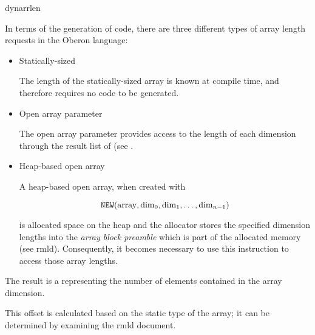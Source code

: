 \begin{instruction}{dynarrlen}

  \begin{notes}

    In terms of the generation of code, there are three different
    types of array length requests in the Oberon language:

    \begin{itemize}
    \item Statically-sized

      The length of the statically-sized array is known at compile
      time, and therefore requires no code to be generated.

    \item Open array parameter

      The open array parameter provides access to the length of each
      dimension through the result list of  (see
      .

    \item Heap-based open array

      A heap-based open array, when created with

      $$\texttt{NEW}(\textrm{array}, \textrm{dim}_0, \textrm{dim}_1,
      \ldots, \textrm{dim}_{n-1})$$

      is allocated space on the heap and the allocator stores the
      specified dimension lengths into the \emph{array block preamble}
      which is part of the allocated memory (see \ac{rmld}).
      Consequently, it becomes necessary to use this instruction to
      access those array lengths.
    \end{itemize}
  \end{notes}

  \begin{results}
  \item The result is a  representing the number of
    elements contained in the array dimension.
  \end{results}

  \begin{operands}
  \item {}
  \item {}
  \item {}

    This offset is calculated based on the static type of the array;
    it can be determined by examining the \ac{rmld} document.
  \end{operands}
\end{instruction}

